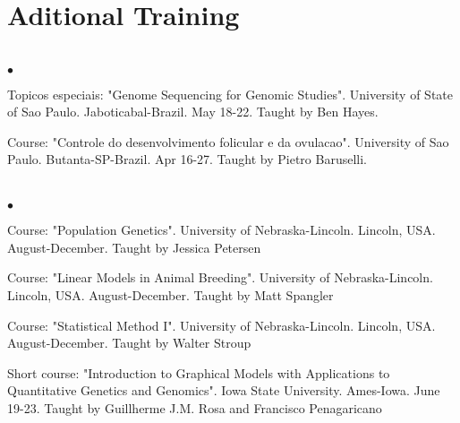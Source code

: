 \documentclass[margin,line,10pt]{res}
\newenvironment{list2}{
  \begin{list}{$\bullet$}{%
      \setlength{\itemsep}{0in}
      \setlength{\parsep}{0in} \setlength{\parskip}{0in}
      \setlength{\topsep}{0in} \setlength{\partopsep}{0in} 
      \setlength{\leftmargin}{0.2in}}}{\end{list}}
\begin{document}
\begin{resume}
\vspace{0.9cm}
\section{\sc Aditional Training} 
\vspace{2cm}

\section{}
\begin{list2}
\item Topicos especiais: "Genome Sequencing for Genomic Studies". University of State of Sao Paulo. Jaboticabal-Brazil. May 18-22. Taught by Ben Hayes.
\vspace{0.5cm}
\item Course: "Controle do desenvolvimento folicular e da ovulacao". University of Sao Paulo. Butanta-SP-Brazil. Apr 16-27. Taught by Pietro Baruselli.
\vspace{0.5cm}
\end{list2}

\section{}
\begin{list2}
\item Course: "Population Genetics". University of Nebraska-Lincoln. Lincoln, USA. August-December. Taught by Jessica Petersen
\vspace{0.5cm}
\item Course: "Linear Models in Animal Breeding". University of Nebraska-Lincoln. Lincoln, USA. August-December. Taught by Matt Spangler
\vspace{0.5cm}
\item Course: "Statistical Method I". University of Nebraska-Lincoln. Lincoln, USA. August-December. Taught by Walter Stroup
\vspace{0.5cm}
\item Short course: "Introduction to Graphical Models with Applications to Quantitative Genetics and Genomics". Iowa State University. Ames-Iowa. June 19-23. Taught by Guillherme J.M. Rosa and Francisco Penagaricano
\vspace{0.5cm}
\end{list2}


\end{resume}
\end{document}

